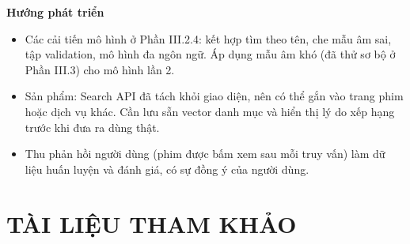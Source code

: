 \documentclass[12pt,a4paper]{article}
\providecommand{\tightlist}{\setlength{\itemsep}{0pt}\setlength{\parskip}{0pt}}
\newcommand{\lbl}[1]{\Needspace{6\baselineskip}\textbf{#1}\par\nopagebreak}
\newcommand{\chap}[1]{\clearpage\section{#1}}
\begin{document}
\lbl{Hướng phát triển}

\begin{itemize}
\tightlist
\item Các cải tiến mô hình ở Phần III.2.4: kết hợp tìm theo tên, che mẫu âm sai, tập validation, mô hình đa ngôn ngữ. Áp dụng mẫu âm khó (đã thử sơ bộ ở Phần III.3) cho mô hình lần 2.
\item Sản phẩm: Search API đã tách khỏi giao diện, nên có thể gắn vào trang phim hoặc dịch vụ khác. Cần lưu sẵn vector danh mục và hiển thị lý do xếp hạng trước khi đưa ra dùng thật.
\item Thu phản hồi người dùng (phim được bấm xem sau mỗi truy vấn) làm dữ liệu huấn luyện và đánh giá, có sự đồng ý của người dùng.
\end{itemize}

\chap{TÀI LIỆU THAM KHẢO}
\end{document}

